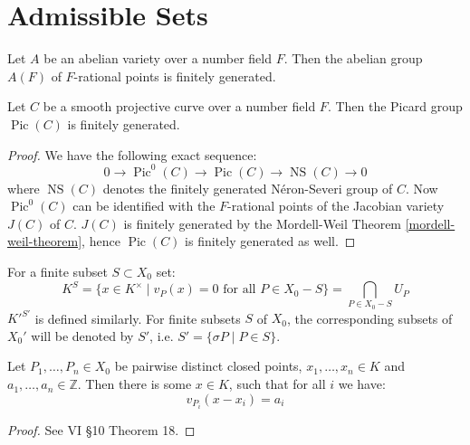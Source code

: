 \section{Admissible Sets}

\begin{theorem}\label{mordell-weil-theorem}
Let $A$ be an abelian variety over a number field $F$. Then the abelian group $A(F)$ of $F$-rational points is finitely generated.
\end{theorem}

\begin{corollary}\label{mordell-weil-corollary}
Let $C$ be a smooth projective curve over a number field $F$. Then the Picard group $\operatorname{Pic}(C)$ is finitely generated.
\end{corollary}

\begin{proof}
We have the following exact sequence:
\[ 0\longrightarrow \operatorname{Pic}^0(C) \longrightarrow\operatorname{Pic}(C) \longrightarrow \operatorname{NS}(C) \longrightarrow 0  \]
where $\operatorname{NS}(C)$ denotes the finitely generated Néron-Severi group of $C$. Now $\operatorname{Pic}^0(C)$ can be identified with the $F$-rational points of the Jacobian variety $J(C)$ of $C$. $J(C)$ is finitely generated by the Mordell-Weil Theorem \ref{mordell-weil-theorem}, hence $\operatorname{Pic}(C)$ is finitely generated as well.
\end{proof}

\begin{definition}\label{4.4}
For a finite subset $S\subset X_0$ set:
\[ K^S=\{x\in K^\times \mid v_P(x)=0\text{ for all }P\in X_0 -  S \} = \bigcap_{P\in X_0 -  S} U_P \]
$K'^{S'}$ is defined similarly. For finite subsets $S$ of $X_0$, the corresponding subsets of $X_0'$ will be denoted by $S'$, i.e. $S'=\{\sigma P\mid P\in S \} $.
\end{definition}

\begin{theorem}\label{weak-approximation}
Let $P_1,\ldots,P_n\in X_0$ be pairwise distinct closed points, $x_1,\ldots,x_n\in K$ and $a_1,\ldots,a_n\in\mathbb{Z}$. Then there is some $x\in K$, such that for all $i$ we have:
\[ v_{P_i}(x-x_i) = a_i \]
\end{theorem}

\begin{proof}
See \cite{ZS60} VI §10 Theorem 18.
\end{proof}

